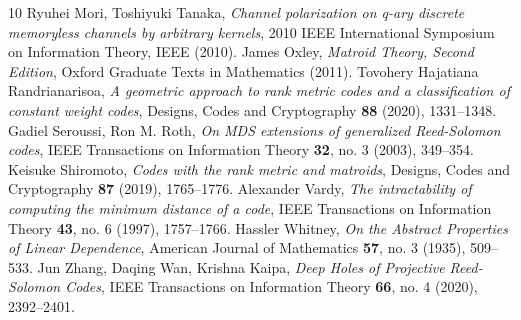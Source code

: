 \documentclass[12pt]{amsart}
\numberwithin{equation}{section}
\theoremstyle{definition}
\begin{document}
\begin{thebibliography}{10}
 Ryuhei Mori, Toshiyuki Tanaka, \emph{Channel polarization on q-ary discrete memoryless channels by arbitrary kernels}, 2010 IEEE International Symposium on Information Theory, IEEE (2010).
 James Oxley, \emph{Matroid Theory, Second Edition}, Oxford Graduate Texts in Mathematics (2011).
 Tovohery Hajatiana Randrianarisoa, \emph{A geometric approach to rank metric codes and a classification of constant weight codes}, Designs, Codes and Cryptography {\bf 88} (2020), 1331--1348.
 Gadiel Seroussi, Ron M. Roth, \emph{On MDS extensions of generalized Reed-Solomon codes}, IEEE Transactions on Information Theory {\bf 32}, no. 3 (2003), 349--354.
 Keisuke Shiromoto, \emph{Codes with the rank metric and matroids}, Designs, Codes and Cryptography {\bf 87} (2019), 1765--1776. 
 Alexander Vardy, \emph{The intractability of computing the minimum distance of a code}, IEEE Transactions on Information Theory {\bf 43}, no. 6 (1997), 1757--1766.
 Hassler Whitney, \emph{On the Abstract Properties of Linear Dependence}, American Journal of Mathematics {\bf 57}, no. 3 (1935), 509--533. 
 Jun Zhang, Daqing Wan, Krishna Kaipa, \emph{Deep Holes of Projective Reed-Solomon Codes}, IEEE Transactions on Information Theory {\bf 66}, no. 4 (2020), 2392--2401.
\end{thebibliography}
\end{document}
